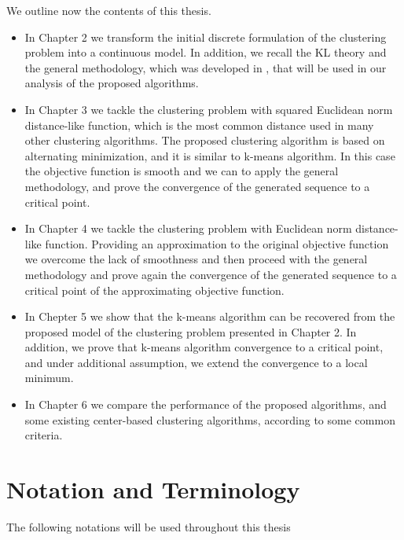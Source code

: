 We outline now the contents of this thesis.
\begin{itemize}
	\item In Chapter 2 we transform the initial discrete formulation  of the clustering problem into a continuous model. In addition, we recall the KL theory and the general methodology, which was developed in \cite{BST2014}, that will be used in our analysis of the proposed algorithms.
	\item In Chapter 3 we tackle the clustering problem with squared Euclidean norm distance-like function, which is the most common distance used in many other clustering algorithms. The proposed clustering algorithm is based on alternating minimization, and it is similar to k-means algorithm. In this case the objective function is smooth and we can to apply the general methodology, and prove the convergence of the generated sequence to a critical point.
	\item In Chapter 4 we tackle the clustering problem with Euclidean norm distance-like function. Providing an approximation to the original objective function we overcome the lack of smoothness and then proceed with the general methodology and prove again the convergence of the generated sequence to a critical point of the approximating objective function.
	\item In Chepter 5 we show that the k-means algorithm can be recovered from the proposed model of the clustering problem presented in Chapter 2. In addition, we prove that k-means algorithm convergence to a critical point, and under additional assumption, we extend the convergence to a local minimum.
	\item In Chapter 6 we compare the performance of the proposed algorithms, and some existing center-based clustering algorithms, according to some common criteria.
\end{itemize}

\section{Notation and Terminology}

The following notations will be used throughout this thesis


